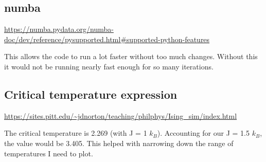 \documentclass[11pt]{article}
\begin{document}
\subsection*{numba}
\url{https://numba.pydata.org/numba-doc/dev/reference/pysupported.html#supported-python-features}

This allows the code to run a lot faster without too much changes. Without this it would not be running nearly fast enough for so many iterations.

\subsection*{Critical temperature expression}
\url{https://sites.pitt.edu/~jdnorton/teaching/philphys/Ising_sim/index.html}

The critical temperature is 2.269 (with J = 1 \(k_B\)). Accounting for our J = 1.5 \(k_{B}\), the value would be 3.405. This helped with narrowing down the range of temperatures I need to plot.
\end{document}
